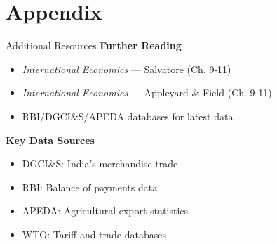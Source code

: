 \documentclass[
  ignorenonframetext,
  aspectratio=169,
]{beamer}
\makeatletter
\providecommand{\tightlist}{%
  \setlength{\itemsep}{0pt}\setlength{\parskip}{0pt}}
\let\quarto@originallabel\label
\DeclareRobustCommand*{\label}[1]{\quarto@originallabel{#1}}
\makeatother
\begin{document}
\section{Appendix}\label{appendix}

\begin{frame}{Additional Resources}
\label{additional-resources}
\textbf{Further Reading}

\begin{itemize}
\tightlist
\item
  \emph{International Economics} --- Salvatore (Ch. 9-11)
\item
  \emph{International Economics} --- Appleyard \& Field (Ch. 9-11)
\item
  RBI/DGCI\&S/APEDA databases for latest data
\end{itemize}

\textbf{Key Data Sources}

\begin{itemize}
\tightlist
\item
  DGCI\&S: India's merchandise trade
\item
  RBI: Balance of payments data\\
\item
  APEDA: Agricultural export statistics
\item
  WTO: Tariff and trade databases
\end{itemize}
\end{frame}
\end{document}
